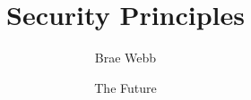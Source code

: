\documentclass{csse4400}
\title{Security Principles}
\author{Brae Webb}
\date{{\color{red} The Future}}
\begin{document}
\makecover





\end{document}
